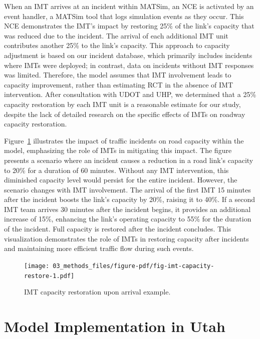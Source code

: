 \documentclass[fancy, oneside, mastersfancy, ms]{byuthesis}
\begin{document}
When an IMT arrives at an incident within MATSim, an NCE is activated by
an event handler, a MATSim tool that logs simulation events as they
occur. This NCE demonstrates the IMT's impact by restoring 25\% of the
link's capacity that was reduced due to the incident. The arrival of
each additional IMT unit contributes another 25\% to the link's
capacity. This approach to capacity adjustment is based on our incident
database, which primarily includes incidents where IMTs were deployed;
in contrast, data on incidents without IMT responses was limited.
Therefore, the model assumes that IMT involvement leads to capacity
improvement, rather than estimating RCT in the absence of IMT
intervention. After consultation with UDOT and UHP, we determined that a
25\% capacity restoration by each IMT unit is a reasonable estimate for
our study, despite the lack of detailed research on the specific effects
of IMTs on roadway capacity restoration.

Figure~\ref{fig-imt-capacity-restore} illustrates the impact of traffic
incidents on road capacity within the model, emphasizing the role of
IMTs in mitigating this impact. The figure presents a scenario where an
incident causes a reduction in a road link's capacity to 20\% for a
duration of 60 minutes. Without any IMT intervention, this diminished
capacity level would persist for the entire incident. However, the
scenario changes with IMT involvement. The arrival of the first IMT 15
minutes after the incident boosts the link's capacity by 20\%, raising
it to 40\%. If a second IMT team arrives 30 minutes after the incident
begins, it provides an additional increase of 15\%, enhancing the link's
operating capacity to 55\% for the duration of the incident. Full
capacity is restored after the incident concludes. This visualization
demonstrates the role of IMTs in restoring capacity after incidents and
maintaining more efficient traffic flow during such events.

\begin{figure}

{\centering \texttt{[image: 03\_methods\_files/figure-pdf/fig-imt-capacity-restore-1.pdf]}

}

\caption{\label{fig-imt-capacity-restore}IMT capacity restoration upon
arrival example.}

\end{figure}

\hypertarget{sec-model_imp}{%
\section{Model Implementation in Utah}\label{sec-model_imp}}
\end{document}

